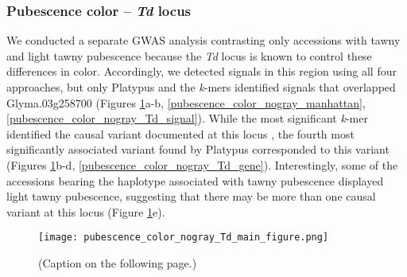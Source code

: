 \subsubsection*{Pubescence color -- \textit{Td} locus}
\label{sv-gwas-main-results-pubescence-color-td}

We conducted a separate GWAS analysis contrasting only accessions with tawny and light
tawny pubescence because the \textit{Td} locus is known to control
these differences in color. Accordingly, we
detected signals in this region using all four approaches, but only Platypus
and the \textit{k}-mers identified signals that overlapped Glyma.03g258700
(Figures \ref{pubescence-color-main-figure}a-b,
\ref{pubescence_color_nogray_manhattan}, \ref{pubescence_color_nogray_Td_signal}).
While the most significant \textit{k}-mer identified the causal variant documented
at this locus \citep{yan2020}, the fourth most significantly associated variant
found by Platypus corresponded to this variant (Figures
\ref{pubescence-color-main-figure}b-d, \ref{pubescence_color_nogray_Td_gene}).
Interestingly, some of the accessions bearing the haplotype associated with tawny pubescence
displayed light tawny pubescence, suggesting that there may be more than one causal
variant at this locus (Figure \ref{pubescence-color-main-figure}e).

\begin{figure}
	\centering
	\texttt{[image: pubescence\_color\_nogray\_Td\_main\_figure.png]}
	\caption[Results of SNP/indel- and \textit{k}-mer-based GWAS at the
	\textit{Td} locus for pubescence color]{(Caption on the following page.)}
	\label{pubescence-color-main-figure}
\end{figure}


